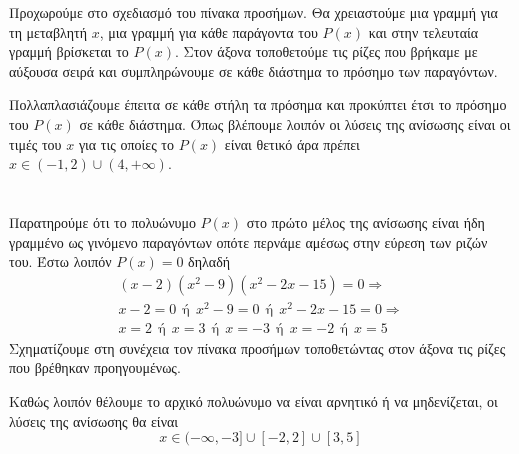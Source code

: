 Προχωρούμε στο σχεδιασμό του πίνακα προσήμων. Θα χρειαστούμε μια γραμμή για τη μεταβλητή $ x $, μια γραμμή για κάθε παράγοντα του $ P(x) $ και στην τελευταία γραμμή βρίσκεται το $ P(x) $. Στον άξονα τοποθετούμε τις ρίζες που βρήκαμε με αύξουσα σειρά και συμπληρώνουμε σε κάθε διάστημα το πρόσημο των παραγόντων.
\begin{center}
\end{center}
Πολλαπλασιάζουμε έπειτα σε κάθε στήλη τα πρόσημα και προκύπτει έτσι το πρόσημο του $ P(x) $ σε κάθε διάστημα. Όπως βλέπουμε λοιπόν οι λύσεις της ανίσωσης είναι οι τιμές του $ x $ για τις οποίες το $ P(x) $ είναι θετικό άρα πρέπει $ x\in(-1,2)\cup(4,+\infty) $.\\\\
\lysh\\
Παρατηρούμε ότι το πολυώνυμο $ P(x) $ στο πρώτο μέλος της ανίσωσης είναι ήδη γραμμένο ως γινόμενο παραγόντων οπότε περνάμε αμέσως στην εύρεση των ριζών του. Έστω λοιπόν $ P(x)=0 $ δηλαδή
\begin{gather*}
(x-2)\left(x^2-9 \right)\left(x^2-2x-15\right)=0\Rightarrow\\
x-2=0\ \ \textrm{ή}\ \ x^2-9=0\ \ \textrm{ή}\ \ x^2-2x-15=0\Rightarrow\\
x=2\ \ \textrm{ή}\ \ x=3\ \ \textrm{ή}\ \ x=-3\ \ \textrm{ή}\ \ x=-2\ \ \textrm{ή}\ \ x=5
\end{gather*}
Σχηματίζουμε στη συνέχεια τον πίνακα προσήμων τοποθετώντας στον άξονα τις ρίζες που βρέθηκαν προηγουμένως.
\begin{center}
\end{center}
Καθώς λοιπόν θέλουμε το αρχικό πολυώνυμο να είναι αρνητικό ή να μηδενίζεται, οι λύσεις της ανίσωσης θα είναι
\[ x\in(-\infty,-3]\cup[-2,2]\cup[3,5] \]
